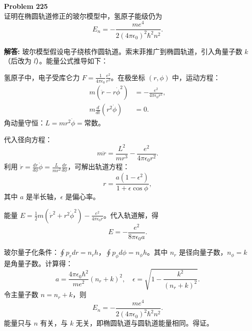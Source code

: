 \documentclass[12pt, a4paper, oneside]{ctexart}
\newenvironment{solution}{\par\noindent\textbf{解答:}\quad}{\par}
\begin{document}
\begin{mdframed}[backgroundcolor=gray!10, linewidth=0pt]
    \textbf{Problem 225} \\
    证明在椭圆轨道修正的玻尔模型中，氢原子能级仍为
    \[
    E_n = -\frac{m e^4}{2 (4\pi\epsilon_0)^2 \hbar^2 n^2}.
    \]
\end{mdframed}
\begin{solution}
    玻尔模型假设电子绕核作圆轨道。索末菲推广到椭圆轨道，引入角量子数 $k$（后改为 $l$）。能量公式推导如下：
    
    氢原子中，电子受库仑力 $F = \frac{1}{4\pi\epsilon_0} \frac{e^2}{r^2}$。在极坐标 $(r,\phi)$ 中，运动方程：
    \begin{align*}
        m (\ddot{r} - r\dot{\phi}^2) &= -\frac{e^2}{4\pi\epsilon_0 r^2}, \\
        m \frac{d}{dt}(r^2 \dot{\phi}) &= 0.
    \end{align*}
    角动量守恒：$L = m r^2 \dot{\phi} = \text{常数}$。
    
    代入径向方程：
    \[
    m \ddot{r} = \frac{L^2}{m r^3} - \frac{e^2}{4\pi\epsilon_0 r^2}.
    \]
    利用 $\dot{r} = \frac{dr}{d\phi} \dot{\phi} = \frac{L}{m r^2} \frac{dr}{d\phi}$，可解出轨道方程：
    \[
    r = \frac{a (1-\epsilon^2)}{1 + \epsilon \cos\phi},
    \]
    其中 $a$ 是半长轴，$\epsilon$ 是偏心率。
    
    能量 $E = \frac{1}{2} m (\dot{r}^2 + r^2 \dot{\phi}^2) - \frac{e^2}{4\pi\epsilon_0 r}$。代入轨道解，得
    \[
    E = -\frac{e^2}{8\pi\epsilon_0 a}.
    \]
    
    玻尔量子化条件：$\oint p_r dr = n_r h$，$\oint p_\phi d\phi = n_\phi h$。其中 $n_r$ 是径向量子数，$n_\phi = k$ 是角量子数。计算得：
    \[
    a = \frac{4\pi\epsilon_0 \hbar^2}{m e^2} (n_r + k)^2, \quad \epsilon = \sqrt{1 - \frac{k^2}{(n_r+k)^2}}.
    \]
    令主量子数 $n = n_r + k$，则
    \[
    E_n = -\frac{m e^4}{2 (4\pi\epsilon_0)^2 \hbar^2 n^2}.
    \]
    能量只与 $n$ 有关，与 $k$ 无关，即椭圆轨道与圆轨道能量相同。得证。
\end{solution}
\end{document}
